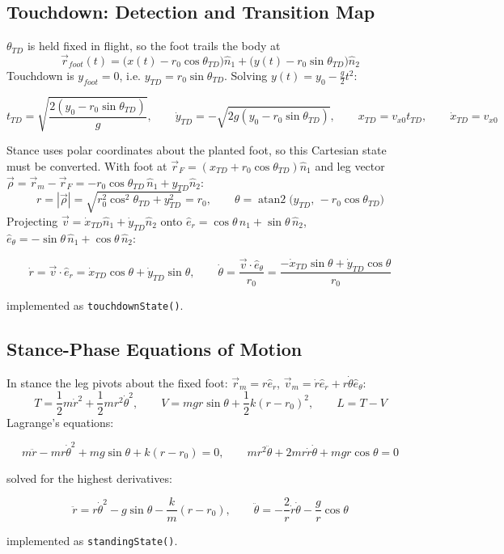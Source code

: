 \documentclass[11pt]{article}
\begin{document}
\subsection{Touchdown: Detection and Transition Map}
$\theta_{TD}$ is held fixed in flight, so the foot trails the body at
\[
    \vec r_{foot}(t) = \big(x(t)-r_0\cos\theta_{TD}\big)\hat n_1
    + \big(y(t)-r_0\sin\theta_{TD}\big)\hat n_2
\]
Touchdown is $y_{foot}=0$, i.e. $y_{TD}=r_0\sin\theta_{TD}$. Solving
$y(t)=y_0-\tfrac g2t^2$:
\begin{result}
\[
    t_{TD}=\sqrt{\frac{2(y_0-r_0\sin\theta_{TD})}{g}}, \qquad
    \dot y_{TD}=-\sqrt{2g(y_0-r_0\sin\theta_{TD})}, \qquad
    x_{TD}=v_{x0}t_{TD}, \qquad \dot x_{TD}=v_{x0}
\]
\end{result}
Stance uses polar coordinates about the planted foot, so this Cartesian
state must be converted. With foot at
$\vec r_F=(x_{TD}+r_0\cos\theta_{TD})\hat n_1$ and leg vector
$\vec\rho=\vec r_m-\vec r_F=-r_0\cos\theta_{TD}\,\hat n_1+y_{TD}\hat n_2$:
\[
    r = |\vec\rho| = \sqrt{r_0^2\cos^2\theta_{TD}+y_{TD}^2} = r_0, \qquad
    \theta = \operatorname{atan2}\!\big(y_{TD},\,-r_0\cos\theta_{TD}\big)
\]
Projecting $\vec v=\dot x_{TD}\hat n_1+\dot y_{TD}\hat n_2$ onto
$\hat e_r=\cos\theta\,\hat n_1+\sin\theta\,\hat n_2$,
$\hat e_\theta=-\sin\theta\,\hat n_1+\cos\theta\,\hat n_2$:
\begin{result}
\[
    \dot r = \vec v\cdot\hat e_r = \dot x_{TD}\cos\theta+\dot y_{TD}\sin\theta,
    \qquad
    \dot\theta = \frac{\vec v\cdot\hat e_\theta}{r_0}
    = \frac{-\dot x_{TD}\sin\theta+\dot y_{TD}\cos\theta}{r_0}
\]
\end{result}
implemented as \texttt{touchdownState()}.

\subsection{Stance-Phase Equations of Motion}
In stance the leg pivots about the fixed foot: $\vec r_m=r\hat e_r$,
$\vec v_m = \dot r\hat e_r+r\dot\theta\hat e_\theta$:
\[
    T=\frac12m\dot r^2+\frac12mr^2\dot\theta^2, \qquad
    V=mgr\sin\theta+\frac12k(r-r_0)^2, \qquad
    L=T-V
\]
Lagrange's equations:
\begin{result}
\[
    m\ddot r-mr\dot\theta^2+mg\sin\theta+k(r-r_0)=0, \qquad
    mr^2\ddot\theta+2mr\dot r\dot\theta+mgr\cos\theta=0
\]
\end{result}
solved for the highest derivatives:
\begin{result}
\[
    \ddot r = r\dot\theta^2-g\sin\theta-\frac{k}{m}(r-r_0), \qquad
    \ddot\theta = -\frac{2}{r}\dot r\dot\theta-\frac{g}{r}\cos\theta
\]
\end{result}
implemented as \texttt{standingState()}.
\end{document}
